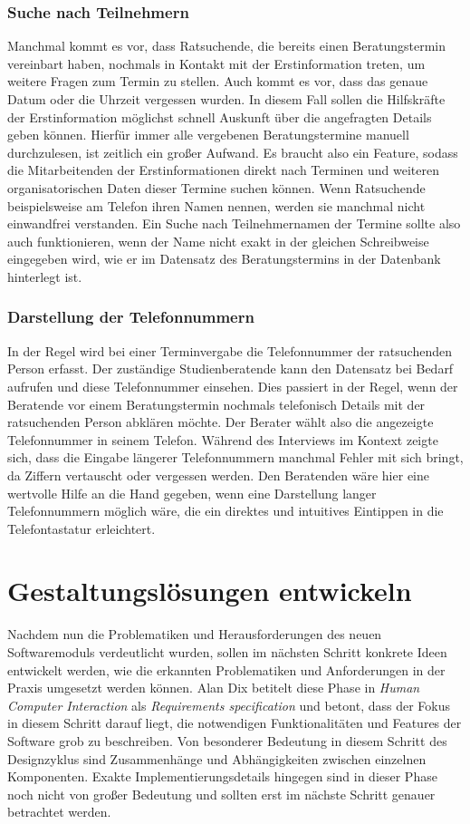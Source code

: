 \subsubsection{Suche nach Teilnehmern}
Manchmal kommt es vor, dass Ratsuchende, die bereits einen Beratungstermin
vereinbart haben, nochmals in Kontakt mit der Erstinformation treten, um
weitere Fragen zum Termin zu stellen. Auch kommt es vor, dass das genaue Datum
oder die Uhrzeit vergessen wurden. In diesem Fall sollen die Hilfskräfte der
Erstinformation möglichst schnell Auskunft über die angefragten Details geben
können. Hierfür immer alle vergebenen Beratungstermine manuell durchzulesen,
ist zeitlich ein großer Aufwand. Es braucht also ein Feature, sodass die
Mitarbeitenden der Erstinformationen direkt nach Terminen und weiteren
organisatorischen Daten dieser Termine suchen können. Wenn Ratsuchende
beispielsweise am Telefon ihren Namen nennen, werden sie manchmal nicht
einwandfrei verstanden. Ein Suche nach Teilnehmernamen der Termine sollte also
auch funktionieren, wenn der Name nicht exakt in der gleichen Schreibweise
eingegeben wird, wie er im Datensatz des Beratungstermins in der Datenbank
hinterlegt ist.

\subsubsection{Darstellung der Telefonnummern}
In der Regel wird bei einer Terminvergabe die Telefonnummer der ratsuchenden
Person erfasst. Der zuständige Studienberatende kann den Datensatz bei Bedarf
aufrufen und diese Telefonnummer einsehen. Dies passiert in der Regel, wenn der
Beratende vor einem Beratungstermin nochmals telefonisch Details mit der
ratsuchenden Person abklären möchte. Der Berater wählt also die angezeigte
Telefonnummer in seinem Telefon. Während des Interviews im Kontext zeigte sich,
dass die Eingabe längerer Telefonnummern manchmal Fehler mit sich bringt, da
Ziffern vertauscht oder vergessen werden. Den Beratenden wäre hier eine
wertvolle Hilfe an die Hand gegeben, wenn eine Darstellung langer
Telefonnummern möglich wäre, die ein direktes und intuitives Eintippen in die
Telefontastatur erleichtert.

\section{Gestaltungslösungen entwickeln}

Nachdem nun die Problematiken und Herausforderungen des neuen Softwaremoduls
verdeutlicht wurden, sollen im nächsten Schritt konkrete Ideen entwickelt
werden, wie die erkannten Problematiken und Anforderungen in der Praxis
umgesetzt werden können. Alan Dix betitelt diese Phase in \textit{Human
    Computer Interaction} als \textit{Requirements specification} und betont, dass
der Fokus in diesem Schritt darauf liegt, die notwendigen Funktionalitäten und
Features der Software grob zu beschreiben. Von besonderer Bedeutung in diesem
Schritt des Designzyklus sind Zusammenhänge und Abhängigkeiten zwischen
einzelnen Komponenten. Exakte Implementierungsdetails hingegen sind in dieser
Phase noch nicht von großer Bedeutung und sollten erst im nächste Schritt
genauer betrachtet werden\cite{hci}.

